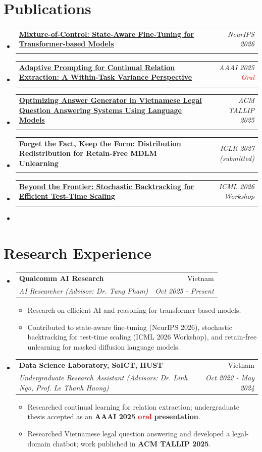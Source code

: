\documentclass[a4paper,10pt]{article}
\makeatletter
\newcommand{\resumeItemWithoutTitle}[1]{
  \item\small{#1}
}
\newcommand{\resumeSubheading}[4]{
  \vspace{-1pt}\item
    \begin{tabular*}{0.97\textwidth}{l@{\extracolsep{\fill}}r}
      \textbf{#1} & #2 \\
      \textit{#3} & \textit{#4} \\
    \end{tabular*}\vspace{-3pt}
}
\newcommand{\resumePublication}[3]{
  \vspace{-1pt}\item
    \begin{tabularx}{0.97\textwidth}[t]{@{}>{\raggedright\arraybackslash}X@{\hspace{1em}}r@{}}
      \textbf{#1} & \textit{#2} \\
      \multicolumn{2}{@{}l}{\small #3} \\
    \end{tabularx}\vspace{-3pt}
}
\newcommand{\resumeSubHeadingListStart}{\begin{itemize}[leftmargin=*,topsep=3pt,itemsep=1pt,parsep=0pt]}
\newcommand{\resumeSubHeadingListEnd}{\end{itemize}}
\newcommand{\resumeItemListStart}{\begin{itemize}[topsep=2pt,itemsep=0pt,parsep=0pt]}
\newcommand{\resumeItemListEnd}{\end{itemize}\vspace{1pt}}
\newcommand{\me}{\textbf{Ngoc Luu}}
\newcommand{\oral}[1]{\textcolor{red}{#1}} %
\makeatother
\begin{document}
\section{Publications}
\resumeSubHeadingListStart
  \resumePublication
    {\href{https://arxiv.org/abs/2606.31397}{Mixture-of-Control: State-Aware Fine-Tuning for Transformer-based Models}}
    {NeurIPS 2026}
    {\me$^*$, Duc Anh Nguyen$^*$, Tung Pham, Toan Tran}
  \resumePublication
    {\href{https://ojs.aaai.org/index.php/AAAI/article/view/34616}{Adaptive Prompting for Continual Relation Extraction: A Within-Task Variance Perspective}}
    {AAAI 2025 \oral{Oral}}
    {\me$^*$, Minh Le$^*$, An Nguyen$^*$, Thanh Thien, Trang Nguyen, Tung Nguyen, Linh Ngo, Thien Huu Nguyen}
  \resumePublication
    {\href{https://doi.org/10.1145/3732938}{Optimizing Answer Generator in Vietnamese Legal Question Answering Systems Using Language Models}}
    {ACM TALLIP 2025}
    {\me$^*$, Huong Le$^*$, Thanh Nguyen, Tuan Dao, Sang Dinh}
  \resumePublication
    {Forget the Fact, Keep the Form: Distribution Redistribution for Retain-Free MDLM Unlearning}
    {ICLR 2027 (submitted)}
    {\me, Giap Nguyen, Dinh Phung, Tung Pham}
  \resumePublication
    {\href{https://arxiv.org/abs/2605.25143}{Beyond the Frontier: Stochastic Backtracking for Efficient Test-Time Scaling}}
    {ICML 2026 Workshop}
    {Dao Tran$^*$, Duc Anh Le$^*$, \me$^*$, Quan Pham$^*$, Tung Pham, Hung Bui}
  \item[] \vspace{1pt}{\footnotesize $^*$Equal contribution.}
\resumeSubHeadingListEnd

\vspace{-5pt}
\section{Research Experience}
  \resumeSubHeadingListStart
    \resumeSubheading{Qualcomm AI Research}{Vietnam}
    {AI Researcher (Advisor: Dr. Tung Pham)}{Oct 2025 - Present}
    \resumeItemListStart
      \resumeItemWithoutTitle{Research on efficient AI and reasoning for transformer-based models.}
      \resumeItemWithoutTitle{Contributed to state-aware fine-tuning (NeurIPS 2026), stochastic backtracking for
        test-time scaling (ICML 2026 Workshop), and retain-free unlearning for masked diffusion language models.}
    \resumeItemListEnd
    \resumeSubheading{Data Science Laboratory, SoICT, HUST}{Vietnam}
    {Undergraduate Research Assistant (Advisors: Dr. Linh Ngo, Prof. Le Thanh Huong)}{Oct 2022 - May 2024}
    \resumeItemListStart
      \resumeItemWithoutTitle{Researched continual learning for relation extraction; undergraduate thesis accepted
        as an \textbf{AAAI 2025 \oral{oral} presentation}.}
      \resumeItemWithoutTitle{Researched Vietnamese legal question answering and developed a legal-domain chatbot;
        work published in \textbf{ACM TALLIP 2025}.}
    \resumeItemListEnd
  \resumeSubHeadingListEnd
\end{document}
